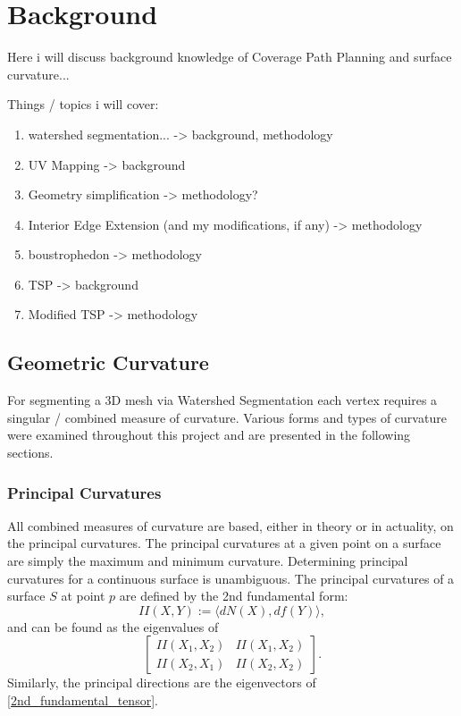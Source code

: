 \chapter{Background}\label{background}
Here i will discuss background knowledge of Coverage Path Planning and surface curvature...

Things / topics i will cover:
\begin{enumerate}
	\item watershed segmentation... -> background, methodology
	\item UV Mapping -> background
	\item Geometry simplification -> methodology?
	\item Interior Edge Extension (and my modifications, if any) -> methodology
	\item boustrophedon -> methodology
	\item TSP -> background
	\item Modified TSP -> methodology
\end{enumerate}


\section{Geometric Curvature}
For segmenting a 3D mesh via Watershed Segmentation each vertex requires a singular / combined measure of curvature.
Various forms and types of curvature were examined throughout this project and are presented in the following sections.

\subsection{Principal Curvatures}
All combined measures of curvature are based, either in theory or in actuality, on the principal curvatures.
The principal curvatures at a given point on a surface are simply the maximum and minimum curvature\cite{DDGAppIntro_17_smooth_k}.
Determining principal curvatures for a continuous surface is unambiguous.
The principal curvatures of a surface $S$ at point $p$ are defined by the 2nd fundamental form\cite{DiffGeo_curves_surfaces, Basic_diff_geo_of_surfaces, DDGAppIntro_17_smooth_k}:
\begin{equation}
	II(X,Y) := \langle dN(X), df(Y)\rangle,
\end{equation}
and can be found as the eigenvalues of
\begin{equation}\label{2nd_fundamental_tensor}
	\begin{bmatrix}
		II(X_1, X_2) & II(X_1, X_2) \\
		II(X_2, X_1) & II(X_2, X_2)
	\end{bmatrix}.
\end{equation}
Similarly, the principal directions are the eigenvectors of \ref{2nd_fundamental_tensor}.


